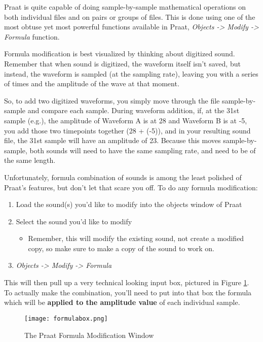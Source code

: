 Praat is quite capable of doing sample-by-sample mathematical operations
on both individual files and on pairs or groups of files. This is done
using one of the most obtuse yet most powerful functions available in
Praat, \emph{Objects -\textgreater{} Modify -\textgreater{} Formula}
function.

Formula modification is best visualized by thinking about digitized
sound. Remember that when sound is digitized, the waveform itself isn't
saved, but instead, the waveform is sampled (at the sampling rate),
leaving you with a series of times and the amplitude of the wave at that
moment.

So, to add two digitized waveforms, you simply move through the file
sample-by-sample and compare each sample. During waveform addition, if,
at the 31st sample (e.g.), the amplitude of Waveform A is at 28 and
Waveform B is at -5, you add those two timepoints together (28 + (-5)),
and in your resulting sound file, the 31st sample will have an amplitude
of 23. Because this moves sample-by-sample, both sounds will need to
have the same sampling rate, and need to be of the same length.

Unfortunately, formula combination of sounds is among the least polished
of Praat's features, but don't let that scare you off. To do any formula
modification:

\begin{enumerate}
\def\labelenumi{\arabic{enumi}.}
\tightlist
\item
  Load the sound(s) you'd like to modify into the objects window of
  Praat
\item
  Select the sound you'd like to modify

  \begin{itemize}
  \tightlist
  \item
    Remember, this will modify the existing sound, not create a modified
    copy, so make sure to make a copy of the sound to work on.
  \end{itemize}
\item
  \emph{Objects -\textgreater{} Modify -\textgreater{} Formula}
\end{enumerate}

This will then pull up a very technical looking input box, pictured in
Figure \ref{formulabox}. To actually make the combination, you'll need
to put into that box the formula which will be \textbf{applied to the
amplitude value} of each individual sample.

\begin{figure}
  \centerline{
    \mbox{\texttt{[image: formulabox.png]}}
  }
  \caption{The Praat Formula Modification Window\label{formulabox}}

  \end{figure}

